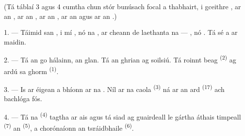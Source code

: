 %
%
%

\VUsaut{3.0mm}
\VUsaut{1.6mm}
\VUsaut{3.4mm}

(Tá táblaí 3 agus 4 cumtha chun stór bunúsach focal a thabhairt, i gceithre
, ar an , ar an , ar an
, ar an  agus ar an .)
\VUsaut{4.0mm}

\VUsaut{3.0mm}

\VUsaut{2.4mm}

\VUsaut{3.0mm}

1. --- Táimid san , i mí ,  nó na
, ar cheann de laethanta na  --- ,  nó . Tá sé a 
ar maidin.

2. --- Tá an  go hálainn, an  glan. Tá an ghrian ag
soilsiú. Tá roinnt  beag \textsuperscript{(2)} ag ardú sa
 ghorm \textsuperscript{(1)}.

3. --- Is ar éigean a bhíonn  ar na . Níl ar na
 caola \textsuperscript{(3)} ná ar an  ard
\textsuperscript{(17)} ach bachlóga fós.

4. --- Tá na  \textsuperscript{(4)} tagtha ar ais agus tá siad ag
guairdeall le gártha áthais timpeall  \textsuperscript{(7)} an
 \textsuperscript{(5)}, a chorónaíonn  an
tsráidbhaile \textsuperscript{(6)}.

